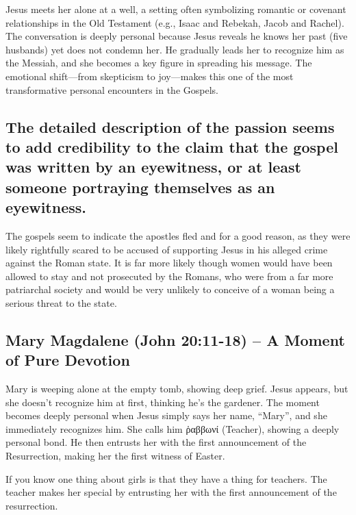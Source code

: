 Jesus meets her alone at a well, a setting often symbolizing romantic or covenant relationships in the Old Testament (e.g., Isaac and Rebekah, Jacob and Rachel).
The conversation is deeply personal because Jesus reveals he knows her past (five husbands) yet does not condemn her.
He gradually leads her to recognize him as the Messiah, and she becomes a key figure in spreading his message.
The emotional shift---from skepticism to joy---makes this one of the most transformative personal encounters in the Gospels.

\subsection{The detailed description of the passion seems to add credibility to the claim that the gospel was written by an eyewitness, or at least someone portraying themselves as an eyewitness.}\label{subsec:the-detailed-description-of-the-passion-seems-to-add-credibility-to-the-claim-that-the-gospel-was-written-by-an-eyewitness-or-at-least-someone-portraying-themselves-as-an-eyewitness.}

The gospels seem to indicate the apostles fled and for a good reason, as they were likely rightfully scared to be accused of supporting Jesus in his alleged crime against the Roman state.
It is far more likely though women would have been allowed to stay and not prosecuted by the Romans, who were from a far more patriarchal society and would be very unlikely to conceive of a woman being a serious threat to the state.

\subsection{Mary Magdalene (John 20:11-18) -- A Moment of Pure Devotion}\label{subsec:mary-magdalene-john-2011-18-a-moment-of-pure-devotion}

Mary is weeping alone at the empty tomb, showing deep grief.
Jesus appears, but she doesn't recognize him at first, thinking he's the gardener.
The moment becomes deeply personal when Jesus simply says her name, ``Mary'', and she immediately recognizes him.
She calls him ῥαββωνί (Teacher), showing a deeply personal bond.
He then entrusts her with the first announcement of the Resurrection, making her the first witness of Easter.

If you know one thing about girls is that they have a thing for teachers.
The teacher makes her special by entrusting her with the first announcement of the resurrection.

